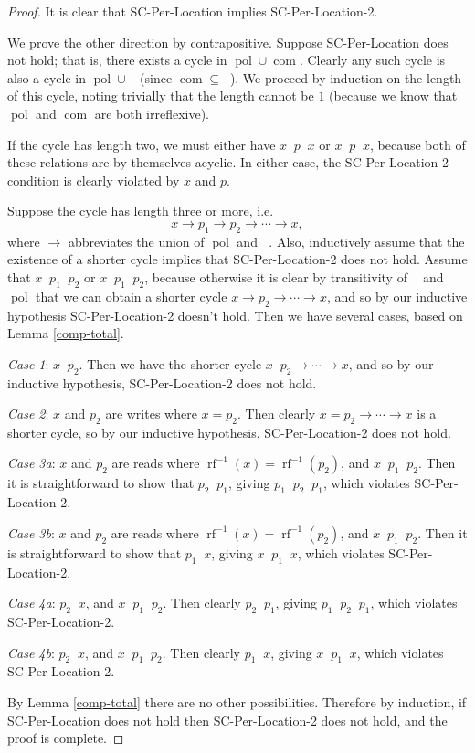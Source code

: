 \documentclass[]{eptcs}
\DeclareMathOperator{\pol}{pol}
\DeclareMathOperator{\rf}{rf}
\DeclareMathOperator{\com}{com}
\DeclareMathOperator{\comp}{com^+}
\DeclareMathOperator{\polto}{\xrightarrow{pol}}
\DeclareMathOperator{\compto}{\xrightarrow{com^+}}
\newcommand{\rfinv}{\rf^{-1}}
\begin{document}
\begin{proof}
It is clear that SC-Per-Location implies SC-Per-Location-2.

We prove the other direction by contrapositive. Suppose SC-Per-Location does not hold; that is, there exists a cycle in $\pol \cup \com$. Clearly any such cycle is also a cycle in $\pol \cup \comp$ (since $\com \subseteq \comp$). We proceed by induction on the length of this cycle, noting trivially that the length cannot be $1$ (because we know that $\pol$ and $\com$ are both irreflexive).

If the cycle has length two, we must either have $x \polto p \compto x$ or $x \compto p \polto x$, because both of these relations are by themselves acyclic. In either case, the SC-Per-Location-2 condition is clearly violated by $x$ and $p$.

Suppose the cycle has length three or more, i.e.
\[
x \to p_1 \to p_2 \to \cdots \to x,
\]
where $\to$ abbreviates the union of $\pol$ and $\comp$. Also, inductively assume that the existence of a shorter cycle implies that SC-Per-Location-2 does not hold. Assume that $x \compto p_1 \polto p_2$ or $x \polto p_1 \compto p_2$, because otherwise it is clear by transitivity of $\comp$ and $\pol$ that we can obtain a shorter cycle $x \to p_2 \to \cdots \to x$, and so by our inductive hypothesis SC-Per-Location-2 doesn't hold. Then we have several cases, based on Lemma \ref{comp-total}.

\emph{Case 1}: $x \compto p_2$. Then we have the shorter cycle $x \compto p_2 \to \cdots \to x$, and so by our inductive hypothesis, SC-Per-Location-2 does not hold.

\emph{Case 2}: $x$ and $p_2$ are writes where $x = p_2$. Then clearly $x = p_2 \to \cdots \to x$ is a shorter cycle, so by our inductive hypothesis, SC-Per-Location-2 does not hold.

\emph{Case 3a}: $x$ and $p_2$ are reads where $\rfinv(x) = \rfinv(p_2)$, and $x \compto p_1 \polto p_2$. Then it is straightforward to show that $p_2 \compto p_1$, giving $p_1 \polto p_2 \compto p_1$, which violates SC-Per-Location-2.

\emph{Case 3b}: $x$ and $p_2$ are reads where $\rfinv(x) = \rfinv(p_2)$, and $x \polto p_1 \compto p_2$. Then it is straightforward to show that $p_1 \compto x$, giving $x \polto p_1 \compto x$, which violates SC-Per-Location-2.

\emph{Case 4a}: $p_2 \compto x$, and $x \compto p_1 \polto p_2$. Then clearly $p_2 \compto p_1$, giving $p_1 \polto p_2 \compto p_1$, which violates SC-Per-Location-2.

\emph{Case 4b}: $p_2 \compto x$, and $x \polto p_1 \compto p_2$. Then clearly $p_1 \compto x$, giving $x \polto p_1 \compto x$, which violates SC-Per-Location-2.

By Lemma \ref{comp-total} there are no other possibilities. Therefore by induction, if SC-Per-Location does not hold then SC-Per-Location-2 does not hold, and the proof is complete.
\end{proof}
\end{document}
